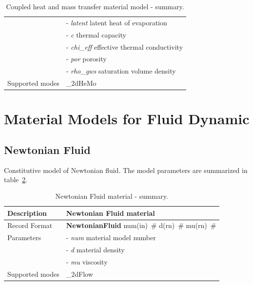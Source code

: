 \documentclass[epsf,a4paper]{article}
\newcommand{\descitem}[1]{{\noindent \bf #1}}
\newcommand{\elemparam}[2]{{{#1\tiny (#2)}~\#}}
\newcommand{\param}[1]{{\it #1}}
\begin{document}
\begin{table}[h]
\begin{tabular}{|l|p{9cm}|}
&- \param{latent} latent heat of evaporation\\
&- \param{c} thermal capacity\\
&- \param{chi\_eff} effective thermal conductivity\\
&- \param{por} porosity\\
&- \param{rho\_gws} saturation volume density\\
Supported modes& \_2dHeMo\\
\hline
\end{tabular}                                                                   
\caption{Coupled heat and mass transfer material model - summary.}                
\label{hemotk_table}                                                         
\end{table}                                                                     


\clearpage
\section{Material Models for Fluid Dynamic}
\subsection{Newtonian Fluid}
\label{NewtonianFluidMaterial}
Constitutive model of Newtonian fluid. The model parameters are summarized
in table~\ref{NewtonianFluidMaterial_table}.

\begin{table}[h]                                                                
\begin{tabular}{|l|p{9cm}|}                                                      
\hline                                                                          
Description & Newtonian Fluid material\\
\hline                                                                          
Record Format & \descitem{NewtonianFluid} \elemparam{num}{in}
\elemparam{d}{rn} \elemparam{mu}{rn}\\
Parameters &- \param{num} material model number\\
&- \param{d} material density\\
&- \param{mu} viscosity\\
Supported modes& \_2dFlow\\
\hline
\end{tabular}                                                                   
\caption{Newtonian Fluid material - summary.}                
\label{NewtonianFluidMaterial_table}                                                         
\end{table}                                                                     
\end{document}
